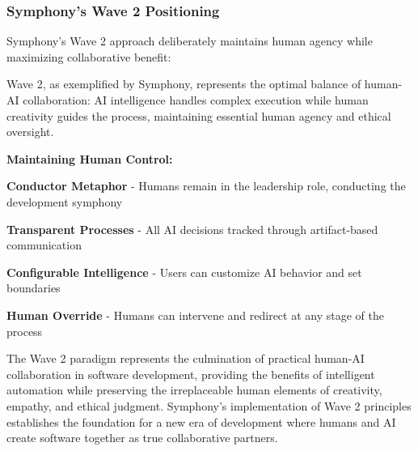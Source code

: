 \subsubsection{Symphony's Wave 2 Positioning}

Symphony's Wave 2 approach deliberately maintains human agency while maximizing collaborative benefit:

\begin{infobox}[title=The Sweet Spot of Collaboration]
Wave 2, as exemplified by Symphony, represents the optimal balance of human-AI collaboration: AI intelligence handles complex execution while human creativity guides the process, maintaining essential human agency and ethical oversight.
\end{infobox}

\textbf{Maintaining Human Control:}

\begin{expandedlist}
    \item \textbf{Conductor Metaphor} - Humans remain in the leadership role, conducting the development symphony
    
    \item \textbf{Transparent Processes} - All AI decisions tracked through artifact-based communication
    
    \item \textbf{Configurable Intelligence} - Users can customize AI behavior and set boundaries
    
    \item \textbf{Human Override} - Humans can intervene and redirect at any stage of the process
\end{expandedlist}

The Wave 2 paradigm represents the culmination of practical human-AI collaboration in software development, providing the benefits of intelligent automation while preserving the irreplaceable human elements of creativity, empathy, and ethical judgment. Symphony's implementation of Wave 2 principles establishes the foundation for a new era of development where humans and AI create software together as true collaborative partners.

